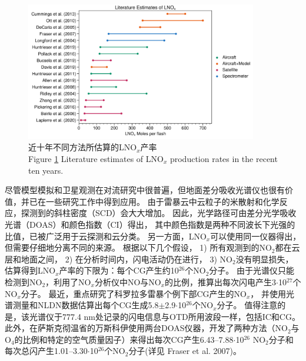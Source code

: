 \begin{figure}[htbp]
\centering
\includegraphics[width=0.9\textwidth]{./figures/lnox_production_xin.png}
\caption{近十年不同方法所估算的LNO$_x$产率\\
Figure \ref{figure:lnox_production_xin} Literature estimates of LNO$_x$ production rates in the recent ten years.}
\label{figure:lnox_production_xin}
\end{figure}

尽管模型模拟和卫星观测在对流研究中很普遍，但地面差分吸收光谱仪也很有价值，并已在一些研究工作中得到应用。
由于雷暴云中云粒子的米散射和化学反应，探测到的斜柱密度（SCD）会大大增加\citep{Erle.1995,Pfeilsticker.1998,Winterrath.1999}。
因此，光学路径可由差分光学吸收光谱（DOAS）\citep{Veitel.1998,Wagner.1998}和颜色指数（CI）得出，
其中颜色指数是两种不同波长下光强的比值，已被广泛用于云探测和云分类\citep{Wagner.2014,Wang.2015,Wagner.2016}。
另一方面，LNO$_x$可以使用同一仪器得出，但需要仔细地分离不同的来源。
\citet{Noxon.1976}根据以下几个假设，
1) 所有观测到的NO$_2$都在云层和地面之间，
2) 在分析时间内，闪电活动仍在进行，
3) NO$_2$没有明显损失，估算得到LNO$_x$产率的下限为：每个CG产生约10$^{26}$个NO$_2$分子。
由于光谱仪只能检测到NO$_2$，\citet{Franzblau.1989}利用了NO$_x$分析仪中NO与NO$_x$的比例，推算出每次闪电产生3$\cdot$10$^{27}$个NO$_x$分子。
最近，\citet{Langford.2004}重点研究了科罗拉多雷暴个例下部CG产生的NO$_x$，
并使用光谱测量和NLDN数据估算出每个CG生成5.8$\pm$2.9$\cdot$10$^{26}$个NO$_x$分子。
值得注意的是，该光谱仪于777.4 nm处记录的闪电信息与OTD所用波段一样，包括IC和CG。
此外，在萨斯克彻温省的万斯科伊使用两台DOAS仪器，开发了两种方法（NO$_2$与O$_4$的比例和特定的空气质量因子）来得出每次CG产生6.43--7.88$\cdot$10$^{26}$ NO$_2$分子和每次总闪产生1.01--3.30$\cdot$10$^{26}$个NO$_2$分子(详见 Fraser et al. 2007)。

